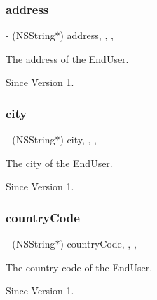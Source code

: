 \subsubsection{\texorpdfstring{address}{address}}
{\footnotesize\ttfamily -\/ (N\+S\+String$\ast$) address\hspace{0.3cm}{\ttfamily [read]}, {\ttfamily [write]}, {\ttfamily [nonatomic]}, {\ttfamily [assign]}}



The address of the End\+User. 

\begin{DoxySince}{Since}
Version 1. 
\end{DoxySince}
\hypertarget{class_x_i_end_user_info_a9e98346fc5468f30109c8bb8fc3fa24c}{}\label{class_x_i_end_user_info_a9e98346fc5468f30109c8bb8fc3fa24c} 
\subsubsection{\texorpdfstring{city}{city}}
{\footnotesize\ttfamily -\/ (N\+S\+String$\ast$) city\hspace{0.3cm}{\ttfamily [read]}, {\ttfamily [write]}, {\ttfamily [nonatomic]}, {\ttfamily [assign]}}



The city of the End\+User. 

\begin{DoxySince}{Since}
Version 1. 
\end{DoxySince}
\hypertarget{class_x_i_end_user_info_a435ace275bece23753f62101469fa138}{}\label{class_x_i_end_user_info_a435ace275bece23753f62101469fa138} 
\subsubsection{\texorpdfstring{country\+Code}{countryCode}}
{\footnotesize\ttfamily -\/ (N\+S\+String$\ast$) country\+Code\hspace{0.3cm}{\ttfamily [read]}, {\ttfamily [write]}, {\ttfamily [nonatomic]}, {\ttfamily [assign]}}



The country code of the End\+User. 

\begin{DoxySince}{Since}
Version 1. 
\end{DoxySince}
\hypertarget{class_x_i_end_user_info_ac5d2e5743d4826b013c5eb21d3a93898}{}\label{class_x_i_end_user_info_ac5d2e5743d4826b013c5eb21d3a93898} 
